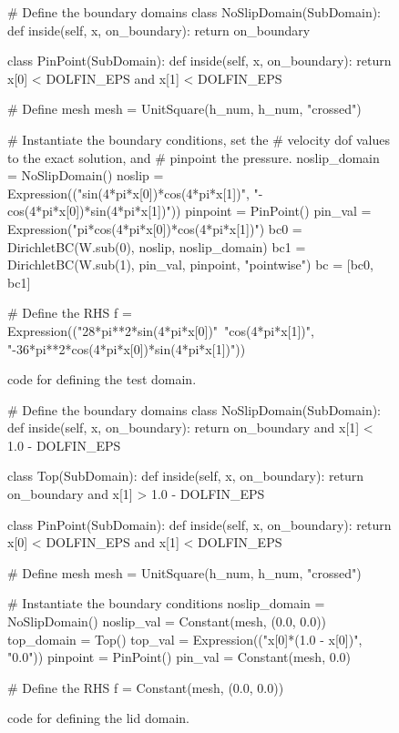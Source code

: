 \begin{figure}
\small
\begin{python}
# Define the boundary domains
class NoSlipDomain(SubDomain):
    def inside(self, x, on_boundary):
        return on_boundary

class PinPoint(SubDomain):
    def inside(self, x, on_boundary):
        return x[0] < DOLFIN_EPS and x[1] < DOLFIN_EPS

# Define mesh
mesh = UnitSquare(h_num, h_num, "crossed")

# Instantiate the boundary conditions, set the
# velocity dof values to the exact solution, and
# pinpoint the pressure.
noslip_domain = NoSlipDomain()
noslip = Expression(("sin(4*pi*x[0])*cos(4*pi*x[1])",
               "-cos(4*pi*x[0])*sin(4*pi*x[1])"))
pinpoint = PinPoint()
pin_val = Expression("pi*cos(4*pi*x[0])*cos(4*pi*x[1])")
bc0 = DirichletBC(W.sub(0), noslip, noslip_domain)
bc1 = DirichletBC(W.sub(1), pin_val, pinpoint, "pointwise")
bc = [bc0, bc1]

# Define the RHS
f = Expression(("28*pi**2*sin(4*pi*x[0])"\
         "cos(4*pi*x[1])",
         "-36*pi**2*cos(4*pi*x[0])*sin(4*pi*x[1])"))

\end{python}
\caption{\dolfin{} code for defining the test domain.}
\label{code:terrel:domain:test}
\end{figure}

\begin{figure}
\small
\begin{python}
# Define the boundary domains
class NoSlipDomain(SubDomain):
    def inside(self, x, on_boundary):
        return on_boundary and x[1] < 1.0 - DOLFIN_EPS

class Top(SubDomain):
    def inside(self, x, on_boundary):
        return on_boundary and x[1] > 1.0 - DOLFIN_EPS

class PinPoint(SubDomain):
    def inside(self, x, on_boundary):
        return x[0] < DOLFIN_EPS and x[1] < DOLFIN_EPS

# Define mesh
mesh = UnitSquare(h_num, h_num, "crossed")

# Instantiate the boundary conditions
noslip_domain = NoSlipDomain()
noslip_val = Constant(mesh, (0.0, 0.0))
top_domain = Top()
top_val = Expression(("x[0]*(1.0 - x[0])", "0.0"))
pinpoint = PinPoint()
pin_val = Constant(mesh, 0.0)

# Define the RHS
f = Constant(mesh, (0.0, 0.0))
\end{python}
\caption{\dolfin{} code for defining the lid domain.}
\label{code:terrel:domain:lid}
\end{figure}


